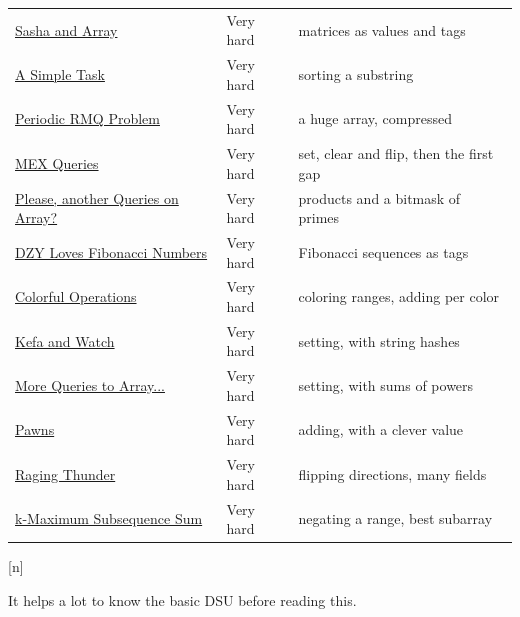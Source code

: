 \begin{center}
\begin{tabular}{@{}lll@{}}
\href{https://codeforces.com/problemset/problem/718/C}{Sasha and Array} & Very hard & matrices as values and tags \\
\href{https://codeforces.com/problemset/problem/558/E}{A Simple Task} & Very hard & sorting a substring \\
\href{https://codeforces.com/problemset/problem/803/G}{Periodic RMQ Problem} & Very hard & a huge array, compressed \\
\href{https://codeforces.com/problemset/problem/817/F}{MEX Queries} & Very hard & set, clear and flip, then the first gap \\
\href{https://codeforces.com/problemset/problem/1114/F}{Please, another Queries on Array?} & Very hard & products and a bitmask of primes \\
\href{https://codeforces.com/problemset/problem/446/C}{DZY Loves Fibonacci Numbers} & Very hard & Fibonacci sequences as tags \\
\href{https://codeforces.com/problemset/problem/1638/E}{Colorful Operations} & Very hard & coloring ranges, adding per color \\
\href{https://codeforces.com/problemset/problem/580/E}{Kefa and Watch} & Very hard & setting, with string hashes \\
\href{https://codeforces.com/problemset/problem/266/E}{More Queries to Array...} & Very hard & setting, with sums of powers \\
\href{https://codeforces.com/problemset/problem/1373/G}{Pawns} & Very hard & adding, with a clever value \\
\href{https://codeforces.com/problemset/problem/1371/F}{Raging Thunder} & Very hard & flipping directions, many fields \\
\href{https://codeforces.com/problemset/problem/280/D}{k-Maximum Subsequence Sum} & Very hard & negating a range, best subarray \\
\bottomrule
\end{tabular}
\end{center}

[\log n]

{\small\leavevmode\color{muted} It helps a lot to know the basic DSU before reading this.\par}

